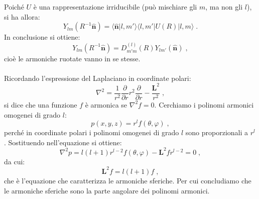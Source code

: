 \documentclass[12pt,a4paper]{report}
\theoremstyle{definition}
\numberwithin{equation}{section}
\newcommand{\bra}{\langle}
\newcommand{\ket}{\rangle}
\begin{document}
Poiché $U$ è una rappresentazione irriducibile (può mischiare gli $m$, ma non gli $l$), si ha allora:
\begin{equation}
Y_{lm}(R^{-1}\hat{\mathbf{n}})=\bra\hat{\mathbf{n}}|l,m'\ket\bra l,m'|U(R)|l,m\ket\;.
\end{equation}
In conclusione si ottiene:
\begin{equation}
Y_{lm}(R^{-1}\hat{\mathbf{n}})=D^{(l)}_{m'm}(R)Y_{lm'}(\hat{\mathbf{n}})\;,
\end{equation}
cioè le armoniche ruotate vanno in se stesse. \\
\\
Ricordando l'espressione del Laplaciano in coordinate polari:
\begin{equation}
\nabla^2=\frac{1}{r^2}\frac{\partial}{\partial r}r^2\frac{\partial}{\partial r}-\frac{\mathbf{L}^2}{r^2}\;,
\end{equation}
si dice che una funzione $f$ è armonica se $\nabla^2f=0$. Cerchiamo i polinomi armonici omogenei di grado $l$:
\begin{equation}
p(x,y,z)=r^l f(\theta,\varphi)\;,
\end{equation}
perché in coordinate polari i polinomi omogenei di grado $l$ sono proporzionali a $r^l$. Sostituendo nell'equazione si ottiene:
\begin{equation}
\nabla^2p=l(l+1)r^{l-2}f(\theta,\varphi)-\mathbf{L}^2 f r^{l-2}=0\;,
\end{equation}
da cui:
\begin{equation}
\mathbf{L}^2f=l(l+1)f\;,
\end{equation}
che è l'equazione che caratterizza le armoniche sferiche. Per cui concludiamo che le armoniche sferiche sono la parte angolare dei polinomi armonici.
\end{document}
